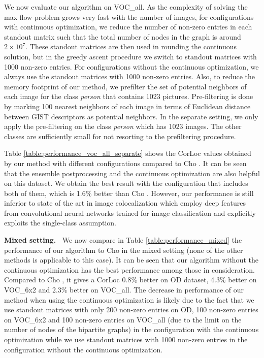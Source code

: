 \documentclass[10pt,twocolumn,letterpaper]{article}
\numberwithin{theorem}{section}
\newcommand{\parag}[1]{\vspace{4pt}\noindent\textbf{#1~}}
\begin{document}
We now evaluate our algorithm on VOC\_all. As the complexity of solving the max flow problem grows very fast with the number of images, for configurations with continuous optimization, we reduce the number of non-zero entries in each standout matrix such that the total number of nodes in the graph is around $2 \times 10^7$. These standout matrices are then used in rounding the continuous solution, but in the greedy ascent procedure we switch to standout matrices with 1000 non-zero entries. For configurations without the continuous optimization, we always use the standout matrices with 1000 non-zero entries. Also, to reduce the memory footprint of our method, we prefilter the set of potential neighbors of each image for the class {\em person} that contains 1023 pictures. Pre-filtering is done by marking 100 nearest neighbors of each image in terms of Euclidean distance between GIST \cite{torralba2008small} descriptors as potential neighbors. In the separate setting, we only apply the pre-filtering on the class \textit{person} which has 1023 images. The other classes are sufficiently small for not resorting to the prefiltering procedure.

Table \ref{table:performance_voc_all_separate} shows the CorLoc values obtained by our method with different configurations compared to Cho \etal. It can be seen that the ensemble postprocessing and the continuous optimization are also helpful on this dataset. We obtain the best result with the configuration that includes both of them, which is 1.6\% better than Cho \etal. However, our performance is still inferior to state of the art in image colocalization \cite{Li2016, Wei2017} which employ deep features from convolutional neural networks trained for image classification and explicitly exploits the single-class assumption. 

\parag{Mixed setting.} 
We now compare in Table \ref{table:performance_mixed} the performance of our algorithm to Cho \etal in the mixed setting (none of the other methods is applicable to this case). It can be seen that our algorithm without the continuous optimization has the best performance among those in consideration. Compared to Cho \etal, it gives a CorLoc 0.8\% better on OD dataset, 4.3\% better on VOC\_6x2 and 2.3\% better on VOC\_all. The decrease in performance of our method when using the continuous optimization is likely due to the fact that we use standout matrices with only 200 non-zero entries on OD, 100 non-zero entries on VOC\_6x2 and 100 non-zero entries on VOC\_all (due to the limit on the number of nodes of the bipartite graphs) in the configuration with the continuous optimization while we use standout matrices with 1000 non-zero entries in the configuration without the continuous optimization.  
\end{document}
